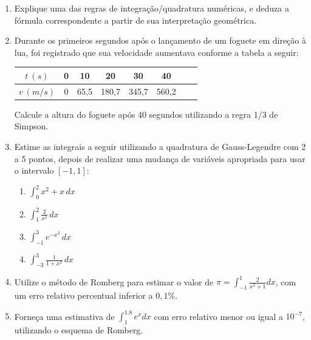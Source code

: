 \documentclass[12pt,a4paper]{article}
\begin{document}
\begin{enumerate}
\item Explique uma das regras de integração/quadratura numéricas, e deduza a fórmula correspondente a partir de sua interpretação geométrica.

\item Durante os primeiros segundos após o lançamento de um foguete em direção à lua, foi registrado que sua velocidade aumentava conforme a tabela a seguir:
\begin{center}
\begin{tabular}{|c|c|c|c|c|c|c|c|}
\hline
  $t\ (s)$ & 0 & 10 & 20 & 30 & 40 \\ \hline
$v\ (m/s)$ & 0 & 65,5 & 180,7 & 345,7 & 560,2 \\ \hline
\end{tabular}
\end{center}
Calcule a altura do foguete após 40 segundos utilizando a regra 1/3 de Simpson.

\item Estime as integrais a seguir utilizando a quadratura de Gauss-Legendre com 2 a 5 pontos, depois de realizar uma mudança de variáveis apropriada para usar o intervalo $[-1,1]$:
\begin{multicols}{4}
\begin{enumerate}
\item $\int_0^2 x^2 + x\,dx$
\item $\int_1^2 \frac{2}{x^2}\,dx$
\item $\int_{-1}^3 e^{-x^2}\,dx$
\item $\int_{-3}^3 \frac{1}{1+x^2} \,dx$
\end{enumerate}
\end{multicols}

\item Utilize o método de Romberg para estimar o valor de $\pi = \int_{-1}^1 \frac{2}{x^2 + 1} dx$, com um erro relativo percentual inferior a $0,1\%$.

\item Forneça uma estimativa de $\int_1^{1.8} e^x dx$ com erro relativo menor ou igual a $10^{-7}$, utilizando o esquema de Romberg.


\end{enumerate}
\end{document}
